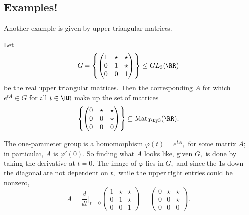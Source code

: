 \subsection{Examples!}

Another example is given by upper triangular matrices.
\begin{example}%
Let
\[
G = \left\{ \begin{pmatrix} 1 & \star & \star \\ 0 & 1 & \star \\ 0 & 0 & 1 \end{pmatrix}\right\} \leq GL_3(\RR)
\]
be the real upper triangular matrices. Then the corresponding $A$ for which $e^{tA}  \in G$ for all $t \in \RR$ make up the set of matrices \[\left\{\begin{pmatrix} 0 & \star & \star \\ 0 & 0 & \star \\ 0 & 0 & 0 \end{pmatrix}\right\} \subseteq \text{Mat}_{3 \by 3}(\RR).\]

\end{example}

The one-parameter group is a homomorphism $\varphi(t) = e^{tA},$ for some matrix $A$; in particular, $A$ is $\varphi'(0).$ So finding what $A$ looks like, given $G,$ is done by taking the derivative at $t = 0.$ The image of $\varphi$ lies in $G,$ and since the 1s down the diagonal are not dependent on $t,$ while the upper right entries could be nonzero, 
\[
A = \frac{d}{dt}\Big|_{t = 0} \begin{pmatrix} 1 & \star & \star \\ 0 & 1 & \star \\ 0 & 0 & 1 \end{pmatrix} = \begin{pmatrix} 0 & \star & \star \\ 0 & 0 & \star \\ 0 & 0 & 0 \end{pmatrix}.
\]

